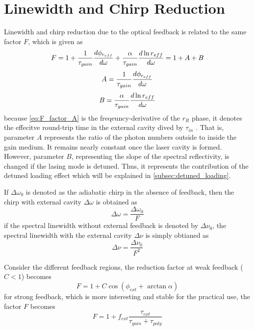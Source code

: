 \section{Linewidth and Chirp Reduction}\label{sec:linewidth_and_chirp_reduction}
Linewidth and chirp reduction due to the optical feedback is related to the same factor $F$, which is given as \cite{kazarinov1987relation}
\begin{equation}
    F=1+\frac{1}{\tau_{gain}}\dv{\phi_{r_{eff}}}{\omega}+\frac{\alpha}{\tau_{gain}}\dv{\ln{r_{eff}}}{\omega}=1+A+B
    \label{eq:F_factor}
\end{equation}
\begin{equation}
    A=\frac{1}{\tau_{gain}}\dv{\phi_{r_{eff}}}{\omega}
    \label{eq:F_factor_A}
\end{equation}
\begin{equation}
    B=\frac{\alpha}{\tau_{gain}}\dv{\ln{r_{eff}}}{\omega}
    \label{eq:F_factor_B}
\end{equation}
because \autoref{eq:F_factor_A} is the freqeuncy-derivative of the $r_R$ phase, it denotes the effecitve round-trip time in the external cavity dived by $\tau_{in}$ \cite{}. That is, parameter $A$ represents the ratio of the photon numbers outside to inside the gain medium. It remains nearly constant once the laser cavity is formed. However, parameter $B$, representing the slope of the spectral reflectivity, is changed if the lasing mode is detuned. Thus, it represents the contribution of the detuned loading effect which will be explained in \autoref{subsec:detuned_loading}.

If $\Delta\omega_0$ is denoted as the adiabatic chirp in the absence of feedback, then the chirp with external cavity $\Delta\omega$ is obtained as \cite{kazarinov1987relation}
\begin{equation}
    \Delta\omega=\frac{\Delta\omega_0}{F}
    \label{eq:chirp_reduction}
\end{equation}
if the spectral linewidth without external feedback is denoted by $\Delta\nu_0$, the spectral linewidth with the external cavity $\Delta\nu$ is simply obtianed as \cite{}
\begin{equation}
    \Delta\nu=\frac{\Delta\nu_0}{F^2}
    \label{eq:linewidth_reduction}
\end{equation}

Consider the different feedback regions, the reduction factor at weak feedback ($C<1$) becomes
\begin{equation}
    F=1+C\cos(\phi_{ext}+\arctan\alpha)
    \label{eq:F_weak_feedback}
\end{equation}
for strong feedback, which is more interesting and stable for the practical use, the factor $F$ becomes
\begin{equation}
    F=1+f_{ext}\frac{\tau_{ext}}{\tau_{gain}+\tau_{poly}}
    \label{eq:F_strong_feedback}
\end{equation}

